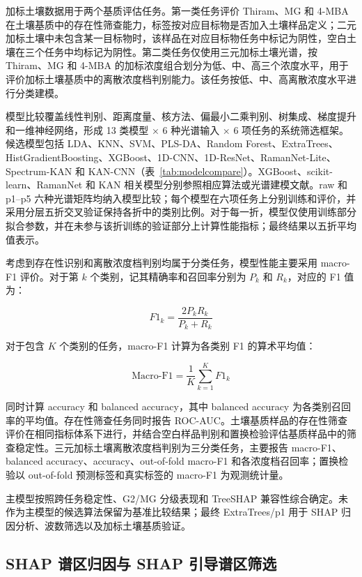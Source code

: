 \documentclass[preprint,12pt]{elsarticle}
\begin{document}
加标土壤数据用于两个基质评估任务。第一类任务评价 Thiram、MG 和 4-MBA 在土壤基质中的存在性筛查能力，标签按对应目标物是否加入土壤样品定义；二元加标土壤中未包含某一目标物时，该样品在对应目标物任务中标记为阴性，空白土壤在三个任务中均标记为阴性。第二类任务仅使用三元加标土壤光谱，按 Thiram、MG 和 4-MBA 的加标浓度组合划分为低、中、高三个浓度水平，用于评价加标土壤基质中的离散浓度档判别能力。该任务按低、中、高离散浓度水平进行分类建模。

模型比较覆盖线性判别、距离度量、核方法、偏最小二乘判别、树集成、梯度提升和一维神经网络，形成 13 类模型 × 6 种光谱输入 × 6 项任务的系统筛选框架。候选模型包括 LDA、KNN、SVM、PLS-DA、Random Forest、ExtraTrees、HistGradientBoosting、XGBoost、1D-CNN、1D-ResNet、RamanNet-Lite、Spectrum-KAN 和 KAN-CNN（表~\ref{tab:modelcompare}）。XGBoost、scikit-learn、RamanNet 和 KAN 相关模型分别参照相应算法或光谱建模文献\cite{ref15,ref16,ref19,ref20,ref21}。raw 和 p1–p5 六种光谱矩阵均纳入模型比较；每个模型在六项任务上分别训练和评价，并采用分层五折交叉验证保持各折中的类别比例。对于每一折，模型仅使用训练部分拟合参数，并在未参与该折训练的验证部分上计算性能指标；最终结果以五折平均值表示。

考虑到存在性识别和离散浓度档判别均属于分类任务，模型性能主要采用 macro-F1 评价。对于第 \(k\) 个类别，记其精确率和召回率分别为 \(P_k\) 和 \(R_k\)，对应的 F1 值为：

\[
F1_k=\frac{2P_kR_k}{P_k+R_k}
\]

对于包含 \(K\) 个类别的任务，macro-F1 计算为各类别 F1 的算术平均值：

\[
\mathrm{Macro\text{-}F1}=\frac{1}{K}\sum_{k=1}^{K}F1_k
\]

同时计算 accuracy 和 balanced accuracy，其中 balanced accuracy 为各类别召回率的平均值。存在性筛查任务同时报告 ROC-AUC。土壤基质样品的存在性筛查评价在相同指标体系下进行，并结合空白样品判别和置换检验评估基质样品中的筛查稳定性。三元加标土壤离散浓度档判别为三分类任务，主要报告 macro-F1、balanced accuracy、accuracy、out-of-fold macro-F1 和各浓度档召回率；置换检验以 out-of-fold 预测标签和真实标签的 macro-F1 为观测统计量。

主模型按照跨任务稳定性、G2/MG 分级表现和 TreeSHAP 兼容性综合确定。未作为主模型的候选算法保留为基准比较结果；最终 ExtraTrees/p1 用于 SHAP 归因分析、波数筛选以及加标土壤基质验证。

\subsection{SHAP 谱区归因与 SHAP 引导谱区筛选}
\end{document}
